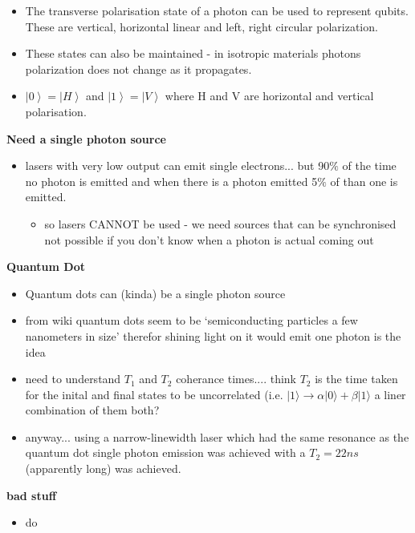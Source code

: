 \begin{itemize}
    \item The transverse polarisation state of a photon can be used to represent qubits. 
    These are vertical, horizontal linear and left, right circular polarization. \cite{bergou_quantum_2021}
    
    \item These states can also be maintained - in isotropic materials photons polarization does not change as it propagates. \cite{bergou_quantum_2021}
    
    \item $\left\vert 0 \right\rangle = \left\vert H\right\rangle $ and $\left\vert 1 \right\rangle = \left\vert V\right\rangle $ where H and V are horizontal and vertical polarisation. \cite{bergou_quantum_2021}

\end{itemize}
\vspace{1em}
{\bf Need a single photon source}
\begin{itemize}
    \item lasers with very low output can emit single electrons... but 90$\%$ of the time no photon is emitted and when there is a photon emitted 5$\%$ of than one is emitted.\cite{nielsen_quantum_2010}
    \begin{itemize}
        \item so lasers CANNOT be used - we need sources that can be synchronised not possible if you don't know when a photon is actual coming out
    \end{itemize}
\end{itemize}
\vspace{1em}

{\bf Quantum Dot}

\begin{itemize}
    \item Quantum dots can (kinda) be a single photon source
    \item from wiki quantum dots seem to be `semiconducting particles a few nanometers in size' therefor shining light on it would emit one photon is the idea
    \item need to understand $T_1$ and $T_2$ coherance times.... think $T_2$ is the time taken for the inital and final states to be uncorrelated (i.e. $|1\rangle \rightarrow \alpha |0\rangle + \beta |1\rangle$ a liner combination of them both?
    \item anyway... using a narrow-linewidth laser which had the same resonance as the quantum dot single photon emission was achieved with a $T_2=22ns$ (apparently long) was achieved. \cite{lodahl_interfacing_2015}
\end{itemize}
\vspace{1em}

{\bf bad stuff}
\begin{itemize}
    \item do
\end{itemize}

